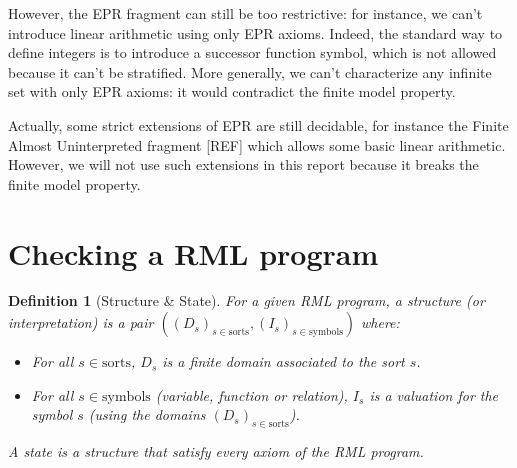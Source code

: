 \documentclass[11pt,a4paper,oldfontcommands,openany]{memoir}
\newtheorem*{definition}{Definition}
\begin{document}
        However, the EPR fragment can still be too restrictive: for instance, we can't introduce linear arithmetic using only EPR axioms.
        Indeed, the standard way to define integers is to introduce a successor function symbol, which is not allowed because it can't be stratified.
        More generally, we can't characterize any infinite set with only EPR axioms: it would contradict the finite model property.

        Actually, some strict extensions of EPR are still decidable, for instance the Finite Almost Uninterpreted fragment [REF] which allows
        some basic linear arithmetic. However, we will not use such extensions in this report because it breaks the finite model property.


        
    
    \section{Checking a RML program}

    \begin{definition}[Structure \& State]
        For a given RML program, a structure (or interpretation) is a pair \(((D_s)_{s\in \text{sorts}}, (I_s)_{s\in \text{symbols}})\) where:
        \begin{itemize}
            \item For all \(s \in \text{sorts}\), \(D_s\) is a finite domain associated to the sort \(s\).
            \item For all \(s \in \text{symbols}\) (variable, function or relation), \(I_s\) is a valuation for the symbol \(s\) (using the domains \((D_s)_{s\in \text{sorts}}\)).
        \end{itemize}
        A state is a structure that satisfy every axiom of the RML program.
    \end{definition}
\end{document}

